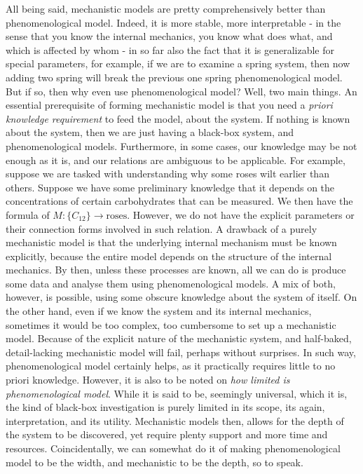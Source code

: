 All being said, mechanistic models are pretty comprehensively better than phenomenological model. Indeed, it is more stable, more interpretable - in the sense that you know the internal mechanics, you know what does what, and which is affected by whom - in so far also the fact that it is generalizable for special parameters, for example, if we are to examine a spring system, then now adding two spring will break the previous one spring phenomenological model. But if so, then why even use phenomenological model? Well, two main things. An essential prerequisite of forming mechanistic model is that you need a \textit{priori knowledge requirement} to feed the model, about the system. If nothing is known about the system, then we are just having a black-box system, and phenomenological models. Furthermore, in some cases, our knowledge may be not enough as it is, and our relations are ambiguous to be applicable. For example, suppose we are tasked with understanding why some roses wilt earlier than others. Suppose we have some preliminary knowledge that it depends on the concentrations of certain carbohydrates that can be measured. We then have the formula of $M: \{C_{12}\} \to \text{roses}$. However, we do not have the explicit parameters or their connection forms involved in such relation. A drawback of a purely mechanistic model is that the underlying internal mechanism must be known explicitly, because the entire model depends on the structure of the internal mechanics. By then, unless these processes are known, all we can do is produce some data and analyse them using phenomenological models. A mix of both, however, is possible, using some obscure knowledge about the system of itself. On the other hand, even if we know the system and its internal mechanics, sometimes it would be too complex, too cumbersome to set up a mechanistic model. Because of the explicit nature of the mechanistic system, and half-baked, detail-lacking mechanistic model will fail, perhaps without surprises. In such way, phenomenological model certainly helps, as it practically requires little to no priori knowledge. However, it is also to be noted on \textit{how limited is phenomenological model}. While it is said to be, seemingly universal, which it is, the kind of black-box investigation is purely limited in its scope, its again, interpretation, and its utility. Mechanistic models then, allows for the depth of the system to be discovered, yet require plenty support and more time and resources. Coincidentally, we can somewhat do it of making phenomenological model to be the width, and mechanistic to be the depth, so to speak. 

